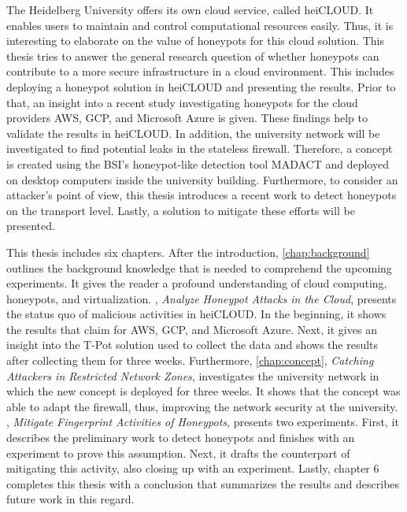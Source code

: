 The Heidelberg University offers its own cloud service, called heiCLOUD.
It enables users to maintain and control computational resources easily. 
Thus, it is interesting to elaborate on the value of honeypots for this cloud solution.
This thesis tries to answer the general research question of whether honeypots can contribute to a more secure infrastructure in a cloud environment.
This includes deploying a honeypot solution in heiCLOUD and presenting the results.
Prior to that, an insight into a recent study investigating honeypots for the cloud providers AWS, GCP, and Microsoft Azure is given.
These findings help to validate the results in heiCLOUD.
In addition, the university network will be investigated to find potential leaks in the stateless firewall.
Therefore, a concept is created using the BSI's honeypot-like detection tool MADACT and deployed on desktop computers inside the university building.
Furthermore, to consider an attacker's point of view, this thesis introduces a recent work to detect honeypots on the transport level.
Lastly, a solution to mitigate these efforts will be presented.

This thesis includes six chapters.
After the introduction, \autoref{chap:background} outlines the background knowledge that is needed to comprehend the upcoming experiments.
It gives the reader a profound understanding of cloud computing, honeypots, and virtualization.
, \textit{Analyze Honeypot Attacks in the Cloud}, presents the status quo of malicious activities in heiCLOUD.
In the beginning, it shows the results that \citet{Kelly2021} claim for AWS, GCP, and Microsoft Azure.
Next, it gives an insight into the T-Pot solution used to collect the data and shows the results after collecting them for three weeks.
Furthermore, \autoref{chap:concept}, \textit{Catching Attackers in Restricted Network Zones}, investigates the university network in which the new concept is deployed for three weeks.
It shows that the concept was able to adapt the firewall, thus, improving the network security at the university.
, \textit{Mitigate Fingerprint Activities of Honeypots}, presents two experiments.
First, it describes the preliminary work to detect honeypots and finishes with an experiment to prove this assumption.
Next, it drafts the counterpart of mitigating this activity, also closing up with an experiment.
Lastly, chapter 6 completes this thesis with a conclusion that summarizes the results and describes future work in this regard.
